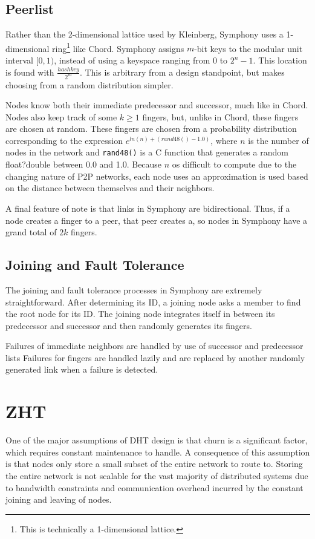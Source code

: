 \documentclass[10pt,letterpaper,twoside]{report}
\begin{document}
\subsection*{Peerlist}
Rather than the 2-dimensional lattice used by Kleinberg, Symphony uses a 1-dimensional ring\footnote{This is technically a 1-dimensional lattice.} like Chord.
Symphony assigns $m$-bit keys to the modular unit interval $ [0,1)$, instead of using a keyspace ranging from 0 to $2^{n} - 1$.
This location is found  with $\frac{hashkey}{2^{m}}$.
This is arbitrary from a design standpoint, but makes choosing from a random distribution simpler. 

Nodes know both their immediate predecessor and successor, much like in Chord.
Nodes also keep track of some  $k \geq 1$ fingers, but, unlike in Chord, these fingers are chosen at random.
These fingers are chosen from a probability distribution corresponding to the expression $e^{ln(n) + (rand48() - 1.0)}$, where $n$ is the number of nodes in the network and \texttt{rand48()} is a C function that generates a random float?double between 0.0 and 1.0.
Because $n$ os difficult to compute due to the changing nature of P2P networks, each node uses an approximation is used based on the distance between themselves and their neighbors.

A final feature of note is that links in Symphony are bidirectional.
Thus, if a node creates a finger to a peer, that peer creates a, so nodes in Symphony have a grand total of $2k$ fingers.


\subsection*{Joining and Fault Tolerance}
The joining and fault tolerance processes in Symphony are extremely straightforward.
After determining its ID, a joining node asks a member to find the root node for its ID.
The joining node integrates itself in between its predecessor and successor and then randomly generates its fingers.

Failures of immediate neighbors are handled by use of successor and predecessor lists
Failures for fingers are handled lazily and are replaced by another randomly generated link when a failure is detected.

\section{ZHT}
One of the major assumptions of DHT design is that churn is a significant factor, which requires constant maintenance to handle.
A consequence of this assumption is that nodes only store a small subset of the entire network to route to.
Storing the entire network is not scalable for the vast majority of distributed systems due to bandwidth constraints and communication overhead incurred by the constant joining and leaving of nodes.
\end{document}
